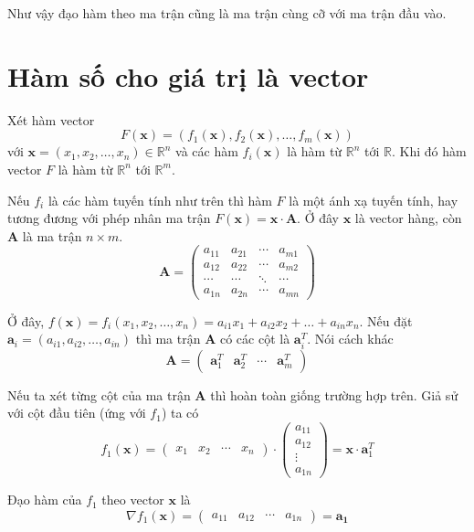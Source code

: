 \documentclass{mynotes}
\newcommand{\RR}{\mathbb{R}}
\begin{document}
Như vậy đạo hàm theo ma trận cũng là ma trận cùng cỡ với ma trận đầu vào.

\section*{Hàm số cho giá trị là vector}

Xét hàm vector \[F(\bm{x}) = (f_1(\bm{x}), f_2(\bm{x}), \ldots, f_m(\bm{x}))\] với $\bm{x} = (x_1, x_2, \ldots, x_n) \in \RR^n$ và các hàm $f_i (\bm{x})$ là hàm từ $\RR^n$ tới $\RR$. Khi đó hàm vector $F$ là hàm từ $\RR^n$ tới $\RR^m$.

Nếu $f_i$ là các hàm tuyến tính như trên thì hàm $F$ là một ánh xạ tuyến tính, hay tương đương với phép nhân ma trận $F(\bm{x}) = \bm{x} \cdot \bm{A}$. Ở đây $\bm{x}$ là vector hàng, còn $\bm{A}$ là ma trận $n \times m$. \[ \bm{A} = \begin{pmatrix}
    a_{11} & a_{21} & \cdots & a_{m1} \\ a_{12} & a_{22} & \cdots & a_{m2} \\ \cdots & \cdots & \ddots & \cdots \\ a_{1n} & a_{2n} & \cdots & a_{mn}
\end{pmatrix}\]

Ở đây, $f(\bm{x}) = f_i(x_1, x_2, \ldots, x_n) = a_{i1} x_1 + a_{i2} x_2 + \ldots + a_{in} x_n$. Nếu đặt $\bm{a}_i = (a_{i1}, a_{i2}, \ldots, a_{in})$ thì ma trận $\bm{A}$ có các cột là $\bm{a}_i^T$. Nói cách khác \[\bm{A} = \begin{pmatrix}
    \bm{a}_1^T & \bm{a}_2^T & \cdots & \bm{a}_m^T
\end{pmatrix}\]

Nếu ta xét từng cột của ma trận $\bm{A}$ thì hoàn toàn giống trường hợp trên. Giả sử với cột đầu tiên (ứng với $f_1$) ta có \[ f_1 (\bm{x}) = \begin{pmatrix}
    x_1 & x_2 & \cdots & x_n
\end{pmatrix} \cdot \begin{pmatrix}
    a_{11} \\ a_{12} \\ \vdots \\ a_{1n}\end{pmatrix} = \bm{x} \cdot \bm{a}_1^T \]

Đạo hàm của $f_1$ theo vector $\bm{x}$ là \[\nabla f_1 (\bm{x}) = \begin{pmatrix}
    a_{11} & a_{12} & \cdots & a_{1n} 
\end{pmatrix} = \bm{a_1}\]
\end{document}
